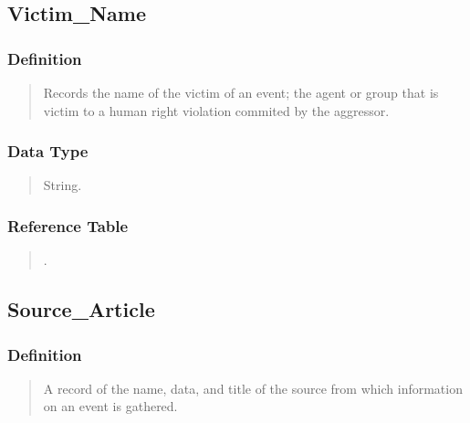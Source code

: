 \documentclass[letterpaper,10pt,english]{sphinxmanual}
\begin{document}
\subsection{Victim\_Name}
\label{\detokenize{schema_tables:victim-name}}

\subsubsection{Definition}
\label{\detokenize{schema_tables:id11}}\begin{quote}

\sphinxAtStartPar
Records the name of the victim of an event; the agent or group that is victim to a human right violation commited by the aggressor.
\end{quote}


\subsubsection{Data Type}
\label{\detokenize{schema_tables:id12}}\begin{quote}

\sphinxAtStartPar
String.
\end{quote}


\subsubsection{Reference Table}
\label{\detokenize{schema_tables:id13}}\begin{quote}

\sphinxAtStartPar
{\hyperref[\detokenize{schema_tables:victim-table}]{}}.
\end{quote}


\subsection{Source\_Article}
\label{\detokenize{schema_tables:source-article}}

\subsubsection{Definition}
\label{\detokenize{schema_tables:id14}}\begin{quote}

\sphinxAtStartPar
A record of the name, data, and title of the source from which information on an event is gathered.
\end{quote}
\end{document}
